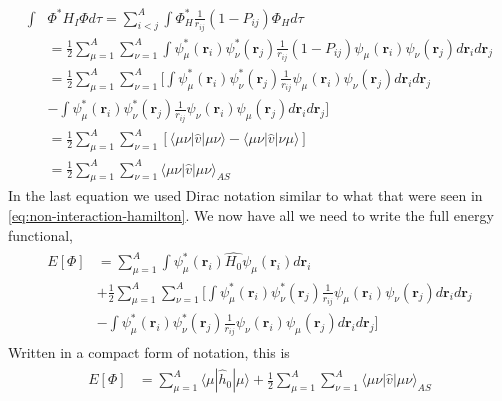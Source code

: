 \documentclass[11pt]{article}
\begin{document}
\begin{align*}
	\int &\Phi^* H_I \Phi d\tau = \sum^A_{i<j} \int \Phi_H^* \frac{1}{r_{ij}} (1 - P_{ij}) \Phi_H d\tau  \\
	&= \frac{1}{2}\sum^A_{\mu=1}\sum^A_{\nu=1} \int \psi_\mu^*(\mathbf{r}_i)\psi_\nu^*(\mathbf{r}_j) \frac{1}{r_{ij}} (1 - P_{ij}) \psi_\mu(\mathbf{r}_i)\psi_\nu(\mathbf{r}_j) d\mathbf{r}_i d\mathbf{r}_j \\
	&= \frac{1}{2}\sum^A_{\mu=1}\sum^A_{\nu=1} \bigg[ \int \psi_\mu^*(\mathbf{r}_i)\psi_\nu^*(\mathbf{r}_j) \frac{1}{r_{ij}} \psi_\mu(\mathbf{r}_i)\psi_\nu(\mathbf{r}_j) d\mathbf{r}_i d\mathbf{r}_j \\ 
	&- \int \psi_\mu^*(\mathbf{r}_i)\psi_\nu^*(\mathbf{r}_j) \frac{1}{r_{ij}} \psi_\nu(\mathbf{r}_i) \psi_\mu(\mathbf{r}_j) d\mathbf{r}_i d\mathbf{r}_j \bigg] \\
	&= \frac{1}{2}\sum^A_{\mu=1}\sum^A_{\nu=1} \left[ \langle\mu\nu|\hat{v}|\mu\nu\rangle - \langle\mu\nu|\hat{v}|\nu\mu\rangle \right] \\
	&= \frac{1}{2}\sum^A_{\mu=1}\sum^A_{\nu=1} \langle\mu\nu|\hat{v}|\mu\nu\rangle_{AS}
\end{align*}
In the last equation we used Dirac notation similar to what that were seen in \eqref{eq:non-interaction-hamilton}. We now have all we need to write the full energy functional,
\begin{align}
	\begin{split}
		E[\Phi] &= \sum^A_{\mu=1} \int \psi^*_\mu(\mathbf{r}_i) \hat{H_0} \psi_\mu(\mathbf{r}_i) d\mathbf{r}_i \\
		&+ \frac{1}{2}\sum^A_{\mu=1}\sum^A_{\nu=1} \bigg[ \int \psi_\mu^*(\mathbf{r}_i)\psi_\nu^*(\mathbf{r}_j) \frac{1}{r_{ij}} \psi_\mu(\mathbf{r}_i)\psi_\nu(\mathbf{r}_j) d\mathbf{r}_i d\mathbf{r}_j \\ 
		&- \int \psi_\mu^*(\mathbf{r}_i)\psi_\nu^*(\mathbf{r}_j) \frac{1}{r_{ij}} \psi_\nu(\mathbf{r}_i) \psi_\mu(\mathbf{r}_j) d\mathbf{r}_i d\mathbf{r}_j \bigg]
	\label{eq:energy-functional}
	\end{split}
\end{align}
Written in a compact form of notation, this is
\begin{align}
	\begin{split}
		E[\Phi] &= \sum^A_{\mu=1} \langle \mu |\hat{h}_0|\mu\rangle + \frac{1}{2}\sum^A_{\mu=1}\sum^A_{\nu=1} \langle\mu\nu|\hat{v}|\mu\nu\rangle_{AS}
	\label{eq:energy-functional-compact}
	\end{split}
\end{align}
\end{document}
